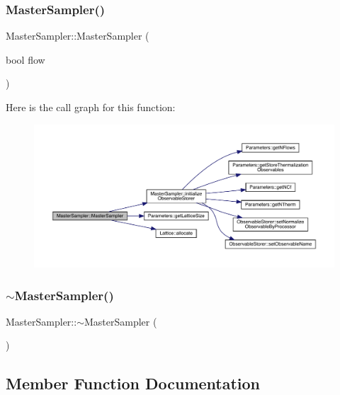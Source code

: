 \subsubsection{\texorpdfstring{MasterSampler()}{MasterSampler()}}
{\footnotesize\ttfamily Master\+Sampler\+::\+Master\+Sampler (\begin{DoxyParamCaption}\item[{bool}]{flow }\end{DoxyParamCaption})}

Here is the call graph for this function\+:
\nopagebreak
\begin{figure}[H]
\begin{center}
\leavevmode
\includegraphics[width=350pt]{class_master_sampler_ac5ee503e8391aca36f73872a45bb6bd9_cgraph}
\end{center}
\end{figure}
\mbox{\label{class_master_sampler_a040e460a888f8dc066de84563f83caa6}} 
\subsubsection{\texorpdfstring{$\sim$MasterSampler()}{~MasterSampler()}}
{\footnotesize\ttfamily Master\+Sampler\+::$\sim$\+Master\+Sampler (\begin{DoxyParamCaption}{ }\end{DoxyParamCaption})}



\subsection{Member Function Documentation}
\mbox{\label{class_master_sampler_ad3cc7e36498dbf4a39238de3ac59ae8b}} 
